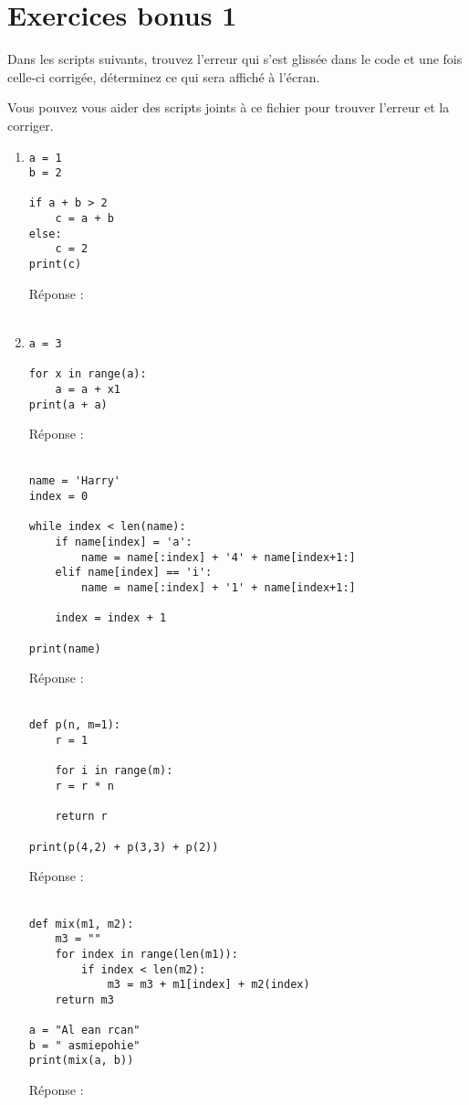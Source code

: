 \documentclass[12pt,a4paper]{article}
\newcommand{\response}{Réponse : \hrulefill\\\\}
\begin{document}
\section*{Exercices bonus 1}

Dans les scripts suivants, trouvez l'erreur qui s'est glissée dans le code et une fois celle-ci corrigée, déterminez ce qui sera affiché à l'écran.

Vous pouvez vous aider des scripts joints à ce fichier pour trouver l'erreur et la corriger.\\

\begin{enumerate}

\item
\begin{lstlisting}
a = 1
b = 2

if a + b > 2
	c = a + b
else:
	c = 2
print(c)
\end{lstlisting}
\response %

\item
\begin{lstlisting}
a = 3

for x in range(a):
	a = a + x1
print(a + a)   
\end{lstlisting}
\response %

\begin{lstlisting}
name = 'Harry'
index = 0

while index < len(name):
	if name[index] = 'a':
		name = name[:index] + '4' + name[index+1:]
	elif name[index] == 'i':
		name = name[:index] + '1' + name[index+1:]

	index = index + 1

print(name)
\end{lstlisting}
\response %

\begin{lstlisting}
def p(n, m=1):
	r = 1
	
	for i in range(m):
	r = r * n

	return r

print(p(4,2) + p(3,3) + p(2)) 
\end{lstlisting}
\response %

\begin{lstlisting}
def mix(m1, m2):
	m3 = ""
	for index in range(len(m1)):
		if index < len(m2):
			m3 = m3 + m1[index] + m2(index)
	return m3
	
a = "Al ean rcan"
b = " asmiepohie"
print(mix(a, b)) 	

\end{lstlisting}
\response %

\end{enumerate}
\end{document}
